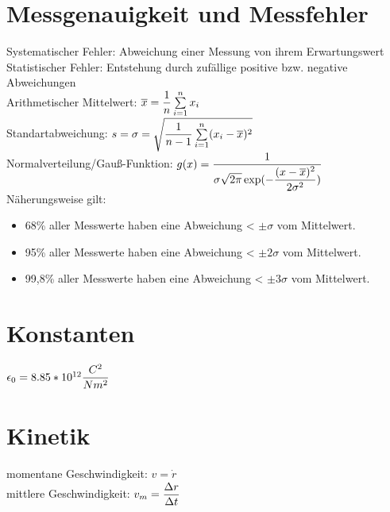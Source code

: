 \documentclass[fs, footer]{latex4ei}
\begin{document}
\vspace{-4mm}
\begin{multicols*}{4}


\section{Messgenauigkeit und Messfehler}
Systematischer Fehler: Abweichung einer Messung von ihrem Erwartungswert\\
Statistischer Fehler: Entstehung durch zufällige positive bzw. negative Abweichungen\\
Arithmetischer Mittelwert: $\ol x = \fr{1}{n}\sum_{i=1}^n x_i$\\
Standartabweichung: $s = \sigma = \sqrt{\fr{1}{n-1}\sum_{i=1}^n (x_i-\ol x)^2}$\\
Normalverteilung/Gauß-Funktion: $g(x) = \dfrac{1}{\sigma \sqrt{2\pi}\exp(-\dfrac{(x-\overline{x})^2}{2\sigma^2})}$\\
Näherungsweise gilt: 
\begin{itemize}
\item 68\% aller Messwerte haben eine Abweichung < $\pm \sigma$ vom Mittelwert.
\item 95\% aller Messwerte haben eine Abweichung < $\pm 2\sigma$ vom Mittelwert.
\item 99,8\% aller Messwerte haben eine Abweichung < $\pm 3\sigma$ vom Mittelwert.
\end{itemize}

\section{Konstanten}
$ \epsilon_0 = 8.85*10^{12} \dfrac{C^2}{Nm^2}$\\

\section{Kinetik}
momentane Geschwindigkeit: $v = \dot r$\\
mittlere Geschwindigkeit: $v_m = \dfrac{\Delta r}{\Delta t}$\\

\end{multicols*}
\end{document}
